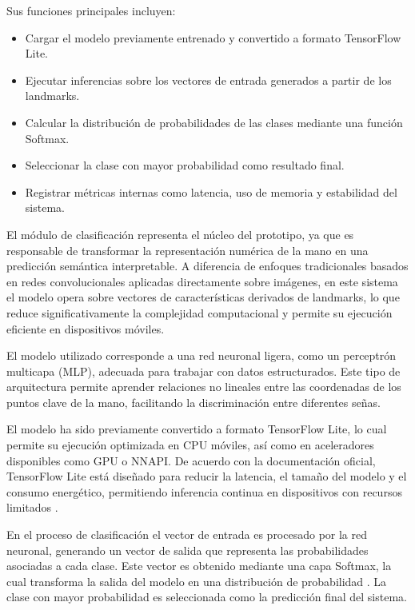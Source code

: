 	Sus funciones principales incluyen:
	\begin{itemize}
		\item Cargar el modelo previamente entrenado y convertido a formato TensorFlow Lite.
		\item Ejecutar inferencias sobre los vectores de entrada generados a partir de los landmarks.
		\item Calcular la distribución de probabilidades de las clases mediante una función Softmax.
		\item Seleccionar la clase con mayor probabilidad como resultado final.
		\item Registrar métricas internas como latencia, uso de memoria y estabilidad del sistema.
	\end{itemize}
	
	El módulo de clasificación representa el núcleo del prototipo, ya que es responsable de transformar la representación numérica de la mano en una predicción semántica interpretable. A diferencia de enfoques tradicionales basados en redes convolucionales aplicadas directamente sobre imágenes, en este sistema el modelo opera sobre vectores de características derivados de landmarks, lo que reduce significativamente la complejidad computacional y permite su ejecución eficiente en dispositivos móviles.
	
	El modelo utilizado corresponde a una red neuronal ligera, como un perceptrón multicapa (MLP), adecuada para trabajar con datos estructurados. Este tipo de arquitectura permite aprender relaciones no lineales entre las coordenadas de los puntos clave de la mano, facilitando la discriminación entre diferentes señas.
	
	El modelo ha sido previamente convertido a formato TensorFlow Lite, lo cual permite su ejecución optimizada en CPU móviles, así como en aceleradores disponibles como GPU o NNAPI. De acuerdo con la documentación oficial, TensorFlow Lite está diseñado para reducir la latencia, el tamaño del modelo y el consumo energético, permitiendo inferencia continua en dispositivos con recursos limitados \cite{tflite}.
	
	En el proceso de clasificación el vector de entrada es procesado por la red neuronal, generando un vector de salida que representa las probabilidades asociadas a cada clase. Este vector es obtenido mediante una capa Softmax, la cual transforma la salida del modelo en una distribución de probabilidad \cite{softmax}. La clase con mayor probabilidad es seleccionada como la predicción final del sistema.
	

